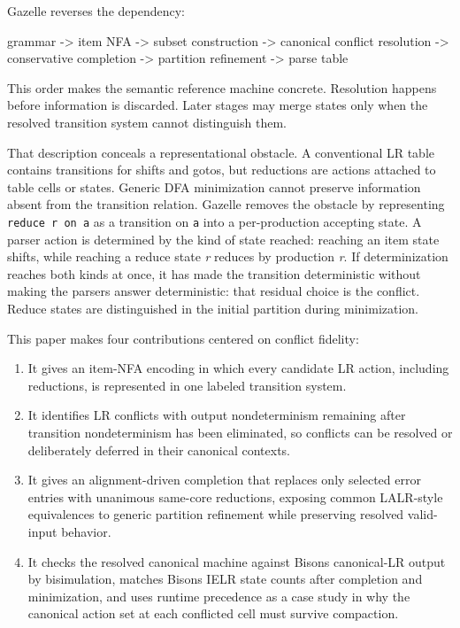 \documentclass[
  10pt,
]{article}
\newenvironment{Shaded}{}{}
\newcommand{\NormalTok}[1]{#1}
\providecommand{\tightlist}{%
  \setlength{\itemsep}{0pt}\setlength{\parskip}{0pt}}
\begin{document}
Gazelle reverses the dependency:

\begin{Shaded}
\begin{Highlighting}[]
\NormalTok{grammar}
\NormalTok{   {-}\textgreater{} item NFA}
\NormalTok{   {-}\textgreater{} subset construction}
\NormalTok{   {-}\textgreater{} canonical conflict resolution}
\NormalTok{   {-}\textgreater{} conservative completion}
\NormalTok{   {-}\textgreater{} partition refinement}
\NormalTok{   {-}\textgreater{} parse table}
\end{Highlighting}
\end{Shaded}

This order makes the semantic reference machine concrete. Resolution
happens before information is discarded. Later stages may merge states
only when the resolved transition system cannot distinguish them.

That description conceals a representational obstacle. A conventional LR
table contains transitions for shifts and gotos, but reductions are
actions attached to table cells or states. Generic DFA minimization
cannot preserve information absent from the transition relation. Gazelle
removes the obstacle by representing \texttt{reduce\ r\ on\ a} as a
transition on \texttt{a} into a per-production accepting state. A parser
action is determined by the kind of state reached: reaching an item
state shifts, while reaching a reduce state \emph{r} reduces by
production \emph{r}. If determinization reaches both kinds at once, it
has made the transition deterministic without making the
parser\textquotesingle s answer deterministic: that residual choice is
the conflict. Reduce states are distinguished in the initial partition
during minimization.

This paper makes four contributions centered on conflict fidelity:

\begin{enumerate}
\def\labelenumi{\arabic{enumi}.}
\tightlist
\item
  It gives an item-NFA encoding in which every candidate LR action,
  including reductions, is represented in one labeled transition
  system.
\item
  It identifies LR conflicts with output nondeterminism remaining after
  transition nondeterminism has been eliminated, so conflicts can be
  resolved or deliberately deferred in their canonical contexts.
\item
  It gives an alignment-driven completion that replaces only selected
  error entries with unanimous same-core reductions, exposing common
  LALR-style equivalences to generic partition refinement while
  preserving resolved valid-input behavior.
\item
  It checks the resolved canonical machine against
  Bison\textquotesingle s canonical-LR output by bisimulation, matches
  Bison\textquotesingle s IELR state counts after completion and
  minimization, and uses runtime precedence as a case study in why the
  canonical action set at each conflicted cell must survive compaction.
\end{enumerate}
\end{document}
